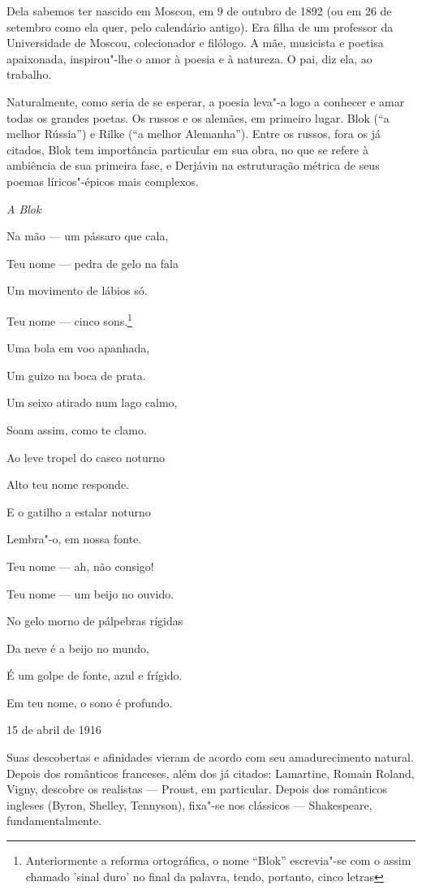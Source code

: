 Dela sabemos ter nascido em Moscou, em 9 de outubro de 1892 (ou em 26 de
setembro como ela quer, pelo calendário antigo). Era filha de um
professor da Universidade de Moscou, colecionador e filólogo. A mãe,
musicista e poetisa apaixonada, inspirou"-lhe o amor à poesia e à
natureza. O pai, diz ela, ao trabalho.

Naturalmente, como seria de se esperar, a poesia leva"-a logo a conhecer
e amar todas os grandes poetas. Os russos e os alemães, em primeiro
lugar. Blok (``a melhor Rússia'') e Rilke (``a melhor Alemanha''). Entre
os russos, fora os já citados, Blok tem importância particular em sua
obra, no que se refere à ambiência de sua primeira fase, e Derjávin na
estruturação métrica de seus poemas líricos"-épicos mais complexos.

\emph{A Blok}

Na mão --- um pássaro que cala,

Teu nome --- pedra de gelo na fala

Um movimento de lábios só.

Teu nome --- cinco sons.\footnote{Anteriormente a reforma ortográfica, o
  nome ``Blok'' escrevia"-se com o assim chamado 'sinal duro' no final da
  palavra, tendo, portanto, cinco letras}

Uma bola em voo apanhada,

Um guizo na boca de prata.

Um seixo atirado num lago calmo,

Soam assim, como te clamo.

Ao leve tropel do casco noturno

Alto teu nome responde.

E o gatilho a estalar noturno

Lembra"-o, em nossa fonte.

Teu nome --- ah, não consigo!

Teu nome --- um beijo no ouvido.

No gelo morno de pálpebras rígidas

Da neve é a beijo no mundo,

É um golpe de fonte, azul e frígido.

Em teu nome, o sono é profundo.

15 de abril de 1916

Suas descobertas e afinidades vieram de acordo com seu amadurecimento
natural. Depois dos românticos franceses, além dos já citados:
Lamartine, Romain Roland, Vigny, descobre os realistas --- Proust, em
particular. Depois dos românticos ingleses (Byron, Shelley, Tennyson),
fixa"-se nos clássicos --- Shakespeare, fundamentalmente.

